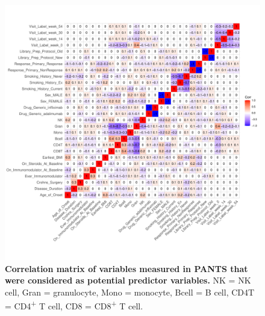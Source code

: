 \begin{figure}
    \centering
    \includegraphics[width=1.0\textwidth,page=1]{mainmatter/figures/chapter_04/process_pheno.pheno_filtered_dge.ggcorrplot.pdf}
    \caption[
    ]{
        \textbf{Correlation matrix of variables measured in \gls{PANTS} that were considered as potential predictor variables.}
        NK = \gls{NK} cell, Gran = granulocyte, Mono = monocyte, Bcell = B cell, CD4T = CD4\textsuperscript{+} T cell, CD8 = CD8\textsuperscript{+} T cell.
    }
    \label{fig:multipants_pheno_filtered_ggcorrplot}
\end{figure}



